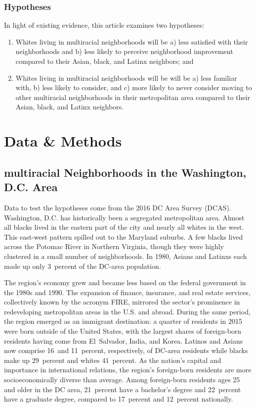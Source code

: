 \documentclass{baderart}
\begin{document}
\subsubsection{Hypotheses}\label{hypotheses}

In light of existing evidence, this article examines two hypotheses:


\begin{enumerate} 

\item   Whites living in multiracial neighborhoods will be a) less satisfied  with their neighborhoods and b) less likely to perceive neighborhood  improvement compared to their Asian, black, and Latinx neighbors; and 

\item   Whites living in multiracial neighborhoods will be will be a) less familiar with, b) less likely to consider, and c) more likely to never consider moving to other multiracial neighborhoods in their metropolitan area compared to their Asian, black, and Latinx neighbors. 

\end{enumerate}

\section{Data \& Methods}\label{data}
\subsection{multiracial Neighborhoods in the Washington, D.C. Area}\label{multiracial-neighborhoods-in-the-washington-d.c.-area}

Data to test the hypotheses come from the 2016 DC Area Survey (DCAS). Washington, D.C. has historically been a segregated metropolitan area. Almost all blacks lived in the eastern part of the city and nearly all whites in the west. This east-west pattern spilled out to the Maryland suburbs. A few blacks lived across the Potomac River in Northern Virginia, though they were highly clustered in a small number of neighborhoods. In 1980, Asians and Latinxs each made up only 3~percent of the DC-area population.

The region's economy grew and became less based on the federal government in the 1980s and 1990. The expansion of finance, insurance, and real estate services, collectively known by the acronym FIRE, mirrored the sector's prominence in redeveloping metropolitan areas in the U.S. and abroad. During the same period, the region emerged as an immigrant destination: a quarter of residents in 2015 were born outside of the United States, with the largest shares of foreign-born residents having come from El~Salvador, India, and Korea. Latinos and Asians now comprise 16~and 11~percent, respectively, of DC-area residents while blacks make up 29~percent and whites 41~percent. As the nation's capital and importance in international relations, the region's foreign-born residents are more socioeconomically diverse than average. Among foreign-born residents ages 25 and older in the DC area, 21~percent have a bachelor's degree and 22~percent have a graduate degree, compared to 17~percent and 12~percent nationally. 
\end{document}
